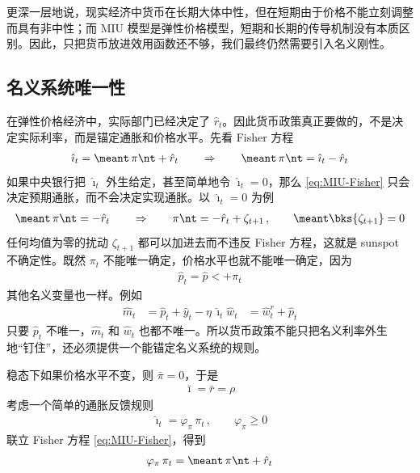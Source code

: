 更深一层地说，现实经济中货币在长期大体中性，但在短期由于价格不能立刻调整而具有非中性；而 MIU 模型是弹性价格模型，短期和长期的传导机制没有本质区别。因此，只把货币放进效用函数还不够，我们最终仍然需要引入名义刚性。

\subsection{名义系统唯一性}


在弹性价格经济中，实际部门已经决定了 \(\hat r_t\)。因此货币政策真正要做的，不是决定实际利率，而是锚定通胀和价格水平。先看 Fisher 方程
\begin{align}
    \hat\imath_t=\meant\,\pi\nt+\hat r_t
    \qquad\Rightarrow\qquad
    \meant\,\pi\nt=\hat\imath_t-\hat r_t\label{eq:MIU-Fisher}
\end{align}
如果中央银行把 \(\hat\imath_t\) 外生给定，甚至简单地令 \(\hat\imath_t=0\)，那么 \ref{eq:MIU-Fisher} 只会决定预期通胀，而不会决定实现通胀。以 \(\hat\imath_t=0\) 为例
\begin{align*}
    \meant\,\pi\nt=-\hat r_t
    \qquad\Rightarrow\qquad
    \pi\nt=-\hat r_t+\zeta_{t+1}\,,\qquad \meant\bks{\zeta_{t+1}}=0
\end{align*}
任何均值为零的扰动 \(\zeta_{t+1}\) 都可以加进去而不违反 Fisher 方程，这就是 sunspot 不确定性。既然 \(\pi_t\) 不能唯一确定，价格水平也就不能唯一确定，因为
\begin{align*}
    \hat p_t=\hat p\lt+\pi_t
\end{align*}
其他名义变量也一样。例如
\begin{align*}
    \hat m_t&=\hat p_t+\hat y_t-\eta\,\hat\imath_t
    \hat w_t&=\hat w^r_t+\hat p_t
\end{align*}
只要 \(\hat p_t\) 不唯一，\(\hat m_t\) 和 \(\hat w_t\) 也都不唯一。所以货币政策不能只把名义利率外生地“钉住”，还必须提供一个能锚定名义系统的规则。

\myskip
{}

稳态下如果价格水平不变，则 \(\bar\pi=0\)，于是
\begin{align*}
    \bar\imath=\bar r=\rho
\end{align*}
考虑一个简单的通胀反馈规则
\begin{align}
    \hat\imath_t=\varphi_\pi\,\pi_t\,,\qquad \varphi_\pi\ge0\label{eq:MIU-simple-Taylor-rule}
\end{align}
联立 Fisher 方程 \ref{eq:MIU-Fisher}，得到
\begin{align}
    \varphi_\pi\,\pi_t=\meant\,\pi\nt+\hat r_t\label{eq:MIU-inflation-difference}
\end{align}

